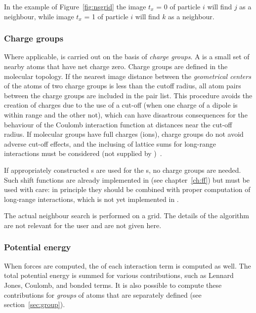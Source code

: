 In the example of Figure~\ref{fig:nsgrid} the image $t_x$ = 0 of particle
$i$ will find $j$ as a neighbour, while image $t_x$ = 1 of particle $i$
will find $k$ as a neighbour.

\subsubsection{Charge groups}
Where applicable,  is carried out on the basis of
{\em  charge groups}. A  is a small set of nearby atoms
that  have net charge zero. Charge groups are defined in the molecular
topology. If the nearest image  distance between the {\em geometrical
centers} of the atoms of two charge groups is less than the cutoff
radius,  all atom pairs between the charge groups are included in the
pair list. This procedure avoids the creation of charges due to
the use  of a cut-off (when one charge of a dipole is within range and
the  other not), which can have disastrous consequences for the
behaviour of  the Coulomb interaction function at distances near the
cut-off  radius. If molecular groups have full charges (ions), charge
groups  do not avoid adverse cut-off effects, and the inclusing of
lattice  sums for long-range interactions must be considered (not
supplied  by {\gromacs})~\cite{Berendsen93a}. 

If appropriately
constructed s are used for the 
s, no
charge groups are needed. Such shift functions are already implemented
in {\gromacs} (see chapter~\ref{ch:ff}) but must be used with
care: in principle they should be combined with proper computation of
long-range interactions, which is not yet implemented in \gromacs.  

The actual neighbour search is performed on a grid. The details of the
algorithm are not relevant for the user and are not given here.

\subsubsection{Potential energy}
When forces are computed, the  of each interaction
term is computed as well. The total potential energy is summed for
various contributions, such as Lennard Jones, Coulomb, and bonded
terms. It is also possible to compute these contributions for {\em
groups} of atoms that are separately defined (see section~\ref{sec:group}).

